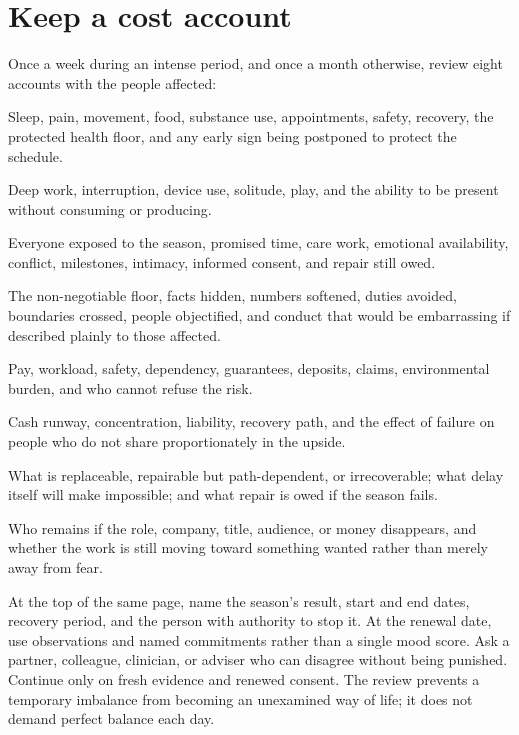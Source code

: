 \section{Keep a cost account}

Once a week during an intense period, and once a month otherwise, review eight
accounts with the people affected:

\begin{description}[leftmargin=2.8em,style=nextline]
\item[Body] Sleep, pain, movement, food, substance use, appointments, safety,
  recovery, the protected health floor, and any early sign being postponed to
  protect the schedule.
\item[Attention] Deep work, interruption, device use, solitude, play, and the
  ability to be present without consuming or producing.
\item[Close people] Everyone exposed to the season, promised time, care work,
  emotional availability, conflict, milestones, intimacy, informed consent,
  and repair still owed.
\item[Integrity] The non-negotiable floor, facts hidden, numbers softened,
  duties avoided, boundaries crossed, people objectified, and conduct that
  would be embarrassing if described plainly to those affected.
\item[Other people's exposure] Pay, workload, safety, dependency, guarantees,
  deposits, claims, environmental burden, and who cannot refuse the risk.
\item[Downside] Cash runway, concentration, liability, recovery path, and the
  effect of failure on people who do not share proportionately in the upside.
\item[Reversibility] What is replaceable, repairable but path-dependent, or
  irrecoverable; what delay itself will make impossible; and what repair is owed
  if the season fails.
\item[Identity and desire] Who remains if the role, company, title, audience,
  or money disappears, and whether the work is still moving toward something
  wanted rather than merely away from fear.
\end{description}

At the top of the same page, name the season's result, start and end dates,
recovery period, and the person with authority to stop it. At the renewal date,
use observations and named commitments rather than a single mood score. Ask a
partner, colleague, clinician, or adviser who can disagree without being
punished. Continue only on fresh evidence and renewed consent. The review
prevents a temporary imbalance from becoming an unexamined way of life; it does
not demand perfect balance each day.


